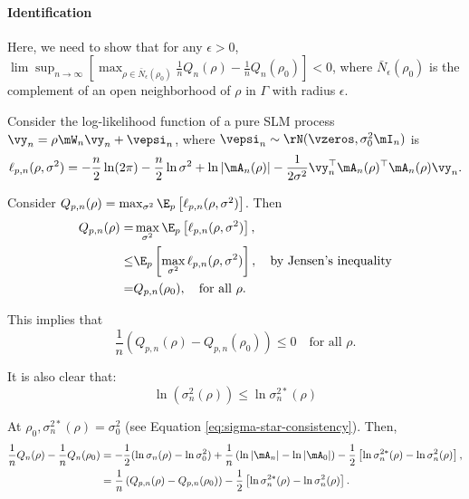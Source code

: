 \documentclass[english,12pt]{book}\usepackage[]{graphicx}\usepackage[]{xcolor}
\begin{document}
\begin{subappendices}
\paragraph{Identification}

Here, we need to show that for any $\epsilon>0$, $\lim\sup_{n \to \infty}\left[\max_{\rho\in\bar{N}_{\epsilon}(\rho_0)}\frac{1}{n}Q_n(\rho) - \frac{1}{n}Q_n(\rho_0)\right]<0$, where $\bar{N}_{\epsilon}(\rho_0)$ is the complement of an open neighborhood of $\rho$ in $\Gamma$ with radius $\epsilon$.

Consider the log-likelihood function of a pure SLM process $\vy_n = \rho\mW_n\vy_n + \vepsi_n$, where $\vepsi_n \sim \rN(\vzeros, \sigma_0^2\mI_n)$ is
\begin{equation*}
\ell_{p, n}(\rho, \sigma^2)= -\frac{n}{2}\ln(2\pi) - \frac{n}{2}\ln\sigma^2 + \ln\left|\mA_n(\rho)\right|-\frac{1}{2\sigma^2}\vy_n^\top\mA_n(\rho)^\top\mA_n(\rho)\vy_n.
\end{equation*}

Consider $Q_{p,n}(\rho) = \max_{\sigma^2}\E_p\left[\ell_{p, n}(\rho, \sigma^2)\right]$. Then
\begin{equation*}
\begin{aligned}
  Q_{p,n}(\rho)  = &\max_{\sigma^2} \E_p\left[\ell_{p, n}(\rho, \sigma^2)\right], \\
                 \leq & \E_p\left[\max_{\sigma^2}\ell_{p, n}(\rho, \sigma^2)\right],\quad \mbox{by Jensen's inequality} \\
                  = & Q_{p, n}(\rho_0), \quad \mbox{for all $\rho$}. 
\end{aligned}
\end{equation*}

This implies that 
\begin{equation*}
  \frac{1}{n}\left(Q_{p,n}(\rho) - Q_{p, n}(\rho_0)\right)\leq 0 \quad \mbox{for all $\rho$}. 
\end{equation*}

It is also clear that:
\begin{equation}
\ln(\sigma_n^2(\rho)) \leq \ln\sigma_n^{2*}(\rho)
\end{equation}

At $\rho_0, \sigma^{2*}_n(\rho) = \sigma_0^2$ (see Equation \eqref{eq:sigma-star-consistency}). Then, 
\begin{equation*}
\begin{aligned}
\frac{1}{n}Q_n(\rho) - \frac{1}{n}Q_n(\rho_0) & = -\frac{1}{2}(\ln \sigma_n(\rho) - \ln \sigma_0^2) + \frac{1}{n}\left(\ln \left|\mA_n\right| - \ln \left|\mA_0\right|\right)- \frac{1}{2}\left[\ln \sigma_n^{2*}(\rho) - \ln \sigma_n^2(\rho)\right], \\
& = \frac{1}{n}\left(Q_{p,n}(\rho) - Q_{p, n}(\rho_0)\right)- \frac{1}{2}\left[\ln \sigma_n^{2*}(\rho) - \ln \sigma_n^2(\rho)\right]. 
\end{aligned}
\end{equation*}


\end{subappendices}
\end{document}
